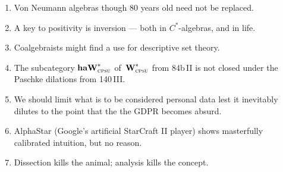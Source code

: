 \documentclass{article}
\begin{document}
\begin{enumerate}
\item
Von Neumann algebras
though 80 years old
need not be replaced.
\item
A key to positivity is inversion --- both in  $C^*$-algebras,
and in life.
\item
Coalgebraists might find a use
for  descriptive set theory.
\item
    The subcategory $\textbf{haW}^*_\text{\textsc{cpsu}}$
        of~$\textbf{W}^*_\text{\textsc{cpsu}}$ from
        \textsf{84b\,II}
        is not closed under the
         Paschke dilations from \textsf{140\,III}.

\item
We should limit what is to be considered personal data
lest it inevitably dilutes to the point
that the the  GDPR becomes absurd.
\item
AlphaStar
        (Google's artificial 
        StarCraft II player)
shows masterfully calibrated
intuition, but no reason.
\item
Dissection kills the animal;
analysis kills the concept.
\end{enumerate}
\end{document}
